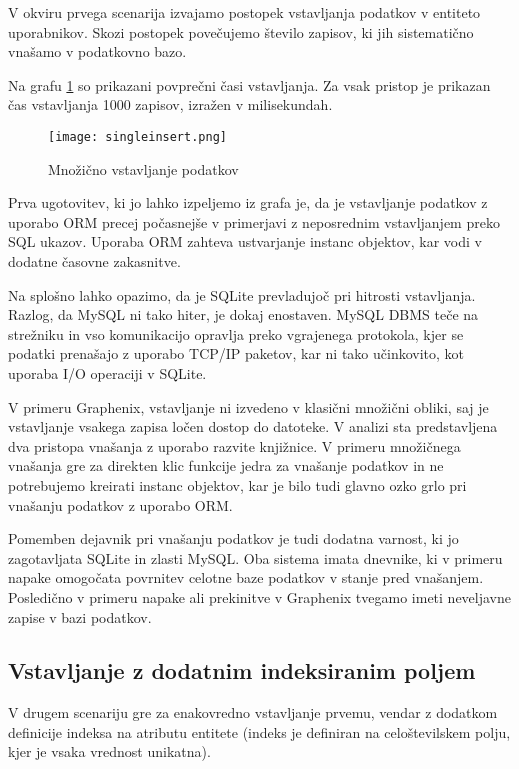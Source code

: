 \documentclass[a4paper,12pt,openright]{book}
\begin{document}
    V okviru prvega scenarija izvajamo postopek vstavljanja podatkov v entiteto uporabnikov. Skozi postopek povečujemo število zapisov, ki jih sistematično vnašamo v podatkovno bazo.

    Na grafu \ref{vnos} so prikazani povprečni časi vstavljanja. Za vsak pristop je prikazan čas vstavljanja 1000 zapisov, izražen v milisekundah.
   
   \begin{figure}[H]
        \centerline{\texttt{[image: singleinsert.png]}}
        \caption{Množično vstavljanje podatkov}
        \label{vnos}
    \end{figure}

    \noindent
    Prva ugotovitev, ki jo lahko izpeljemo iz grafa je, da je vstavljanje podatkov z uporabo ORM precej počasnejše v primerjavi z neposrednim vstavljanjem preko SQL ukazov. Uporaba ORM zahteva ustvarjanje instanc objektov, kar vodi v dodatne časovne zakasnitve.

    Na splošno lahko opazimo, da je SQLite prevladujoč pri hitrosti vstavljanja. Razlog, da MySQL ni tako hiter, je dokaj enostaven. MySQL DBMS teče na strežniku in vso komunikacijo opravlja preko vgrajenega protokola, kjer se podatki prenašajo z uporabo TCP/IP paketov, kar ni tako učinkovito, kot uporaba I/O operaciji v SQLite.

    V primeru Graphenix, vstavljanje ni izvedeno v klasični množični obliki, saj je vstavljanje vsakega zapisa ločen dostop do datoteke. V analizi sta predstavljena dva pristopa vnašanja z uporabo razvite knjižnice. V primeru množičnega vnašanja gre za direkten klic funkcije jedra za vnašanje podatkov in ne potrebujemo kreirati instanc objektov, kar je bilo tudi glavno ozko grlo pri vnašanju podatkov z uporabo ORM.

    Pomemben dejavnik pri vnašanju podatkov je tudi dodatna varnost, ki jo zagotavljata SQLite in zlasti MySQL. Oba sistema imata dnevnike, ki v primeru napake omogočata povrnitev celotne baze podatkov v stanje pred vnašanjem. Posledično v primeru napake ali prekinitve v Graphenix tvegamo imeti neveljavne zapise v bazi podatkov.

    \subsection{Vstavljanje z dodatnim indeksiranim poljem}

    V drugem scenariju gre za enakovredno vstavljanje prvemu, vendar z dodatkom definicije indeksa na atributu entitete (indeks je definiran na celoštevilskem polju, kjer je vsaka vrednost unikatna).
    
\end{document}
